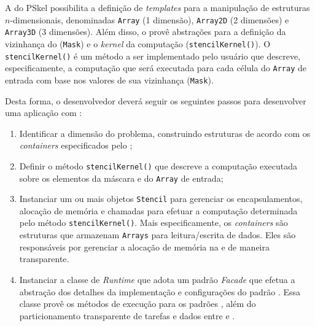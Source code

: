 A \api do PSkel possibilita a definição de \textit{templates} para a manipulação
de estruturas $n$-dimensionais, denominadas \texttt{Array} (1 dimensão),
\texttt{Array2D} (2 dimensões) e \texttt{Array3D} (3 dimensões). Além disso, o
\fw provê abstrações para a definição da vizinhança do \stencil (\texttt{Mask})
e o \textit{kernel} da computação \stencil (\texttt{stencilKernel()}). O
\texttt{stencilKernel()} é um método a ser implementado pelo usuário que
descreve, especificamente, a computação que será executada para cada célula do
\texttt{Array} de entrada com base nos valores de sua vizinhança (\texttt{Mask}).

Desta forma, o desenvolvedor deverá seguir os seguintes passos para desenvolver
uma aplicação \stencil com \pskel:

\begin{enumerate}
	\item Identificar a dimensão do problema, construindo estruturas de acordo com
	os \textit{containers} especificados pelo \fw;

	\item Definir o método \texttt{stencilKernel()} que descreve a computação executada
	sobre os elementos da máscara e do \texttt{Array} de entrada;

	\item Instanciar um ou mais objetos \texttt{Stencil} para gerenciar os encapsulamentos,
	alocação de memória e chamadas para efetuar a computação determinada pelo método
	\texttt{stencilKernel()}. Mais especificamente, os \textit{containers} são estruturas que
	armazenam \texttt{Arrays} para leitura/escrita de dados. Eles são responsáveis por
	gerenciar a alocação de memória na \cpu e \gpu de maneira transparente.

	\item Instanciar a classe de \textit{Runtime} que adota um padrão \textit{Facade} que
	efetua a abstração dos detalhes da implementação e configurações do padrão \stencil.
	Essa classe provê os métodos de execução para os padrões \stencil, além do
	particionamento transparente de tarefas e dados entre \cpu e \gpu.
\end{enumerate}

%

